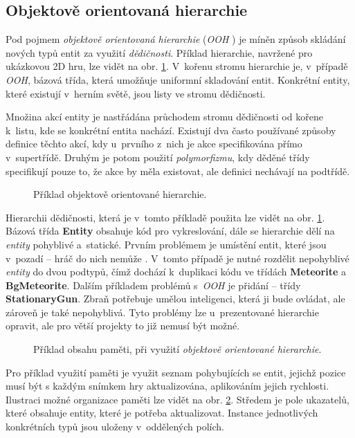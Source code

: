\subsection{Objektově orientovaná hierarchie}

Pod pojmem \emph{objektově orientovaná hierarchie} (\emph{OOH} \cite{GameDesignPatterns}) je míněn způsob skládání nových typů entit za využití \emph{dědičnosti}. Příklad hierarchie, navržené pro ukázkovou 2D hru, lze vidět na obr. \ref{Fig:OOPHierarchy}. V~kořenu stromu hierarchie je, v~případě \emph{OOH}, bázová třída, která umožňuje uniformní skladování entit. Konkrétní entity, které existují v~herním světě, jsou listy ve stromu dědičnosti.

Množina akcí entity je nastřádána průchodem stromu dědičnosti od kořene k~listu, kde se konkrétní entita nachází. Existují dva často používané způsoby definice těchto akcí, kdy u~prvního z~nich je akce specifikována přímo v~supertřídě. Druhým je potom použití \emph{polymorfizmu}, kdy děděné třídy specifikují pouze to, že akce by měla existovat, ale definici nechávají na podtřídě.

\begin{figure}[H]
	\centering
	\caption{Příklad objektově orientované hierarchie.}
	\label{Fig:OOPHierarchy}
\end{figure}

Hierarchii dědičnosti, která je v~tomto příkladě použita lze vidět na obr. \ref{Fig:OOPHierarchy}. Bázová třída \textbf{Entity} obsahuje kód pro vykreslování, dále se hierarchie dělí na \emph{entity} pohyblivé a~statické. Prvním problémem je umístění entit, které jsou v~pozadí -- hráč do nich nemůže . V~tomto případě je nutné rozdělit nepohyblivé \emph{entity} do dvou podtypů, čímž dochází k~duplikaci kódu ve třídách \textbf{Meteorite} a \textbf{BgMeteorite}. Dalším příkladem problémů s~\emph{OOH} je přidání  -- třídy \textbf{StationaryGun}. Zbraň potřebuje umělou inteligenci, která ji bude ovládat, ale zároveň je také nepohyblivá. Tyto problémy lze u~prezentované hierarchie opravit, ale pro větší projekty to již nemusí být možné. 

\begin{figure}[H]
	\centering
	\caption{Příklad obsahu paměti, při využití \emph{objektově orientované hierarchie}.}
	\label{Fig:OOPMemory}
\end{figure}

Pro příklad využití paměti je využit seznam pohybujících se entit, jejichž pozice musí být s každým snímkem hry aktualizována, aplikováním jejich rychlosti. Ilustraci možné organizace paměti lze vidět na obr. \ref{Fig:OOPMemory}. Středem je pole ukazatelů, které obsahuje entity, které je potřeba aktualizovat. Instance jednotlivých konkrétních typů jsou uloženy v~oddělených polích.


